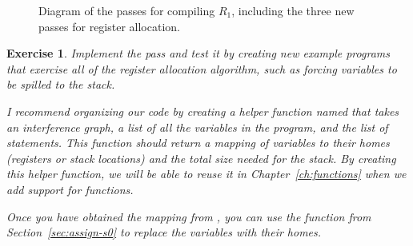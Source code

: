 \documentclass[11pt]{book}
\newtheorem{exercise}[theorem]{Exercise}
\begin{document}
\begin{figure}[p]
\caption{Diagram of the passes for compiling $R_1$, including the
  three new passes for register allocation.}
\label{fig:reg-alloc-passes}
\end{figure}

\begin{exercise}\normalfont
Implement the pass  and test it by creating
new example programs that exercise all of the register allocation
algorithm, such as forcing variables to be spilled to the stack.

I recommend organizing our code by creating a helper function named
 that takes an interference graph, a list of all
the variables in the program, and the list of statements. This
function should return a mapping of variables to their homes
(registers or stack locations) and the total size needed for the
stack. By creating this helper function, we will be able to reuse it
in Chapter~\ref{ch:functions} when we add support for functions.

Once you have obtained the mapping from , you can
use the  function from Section~\ref{sec:assign-s0}
to replace the variables with their homes.
\end{exercise}
\end{document}
